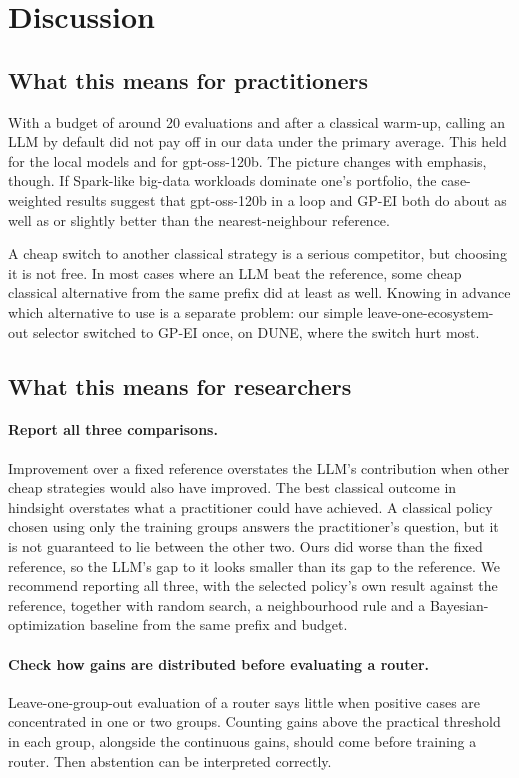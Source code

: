 \section{Discussion}

\subsection{What this means for practitioners}

With a budget of around 20 evaluations and after a classical warm-up, calling an LLM by default did not pay off in our data under the primary average. This held for the local models and for gpt-oss-120b. The picture changes with emphasis, though. If Spark-like big-data workloads dominate one's portfolio, the case-weighted results suggest that gpt-oss-120b in a loop and GP-EI both do about as well as or slightly better than the nearest-neighbour reference.

A cheap switch to another classical strategy is a serious competitor, but choosing it is not free. In most cases where an LLM beat the reference, some cheap classical alternative from the same prefix did at least as well. Knowing in advance which alternative to use is a separate problem: our simple leave-one-ecosystem-out selector switched to GP-EI once, on DUNE, where the switch hurt most.

\subsection{What this means for researchers}

\paragraph{Report all three comparisons.} Improvement over a fixed reference overstates the LLM's contribution when other cheap strategies would also have improved. The best classical outcome in hindsight overstates what a practitioner could have achieved. A classical policy chosen using only the training groups answers the practitioner's question, but it is not guaranteed to lie between the other two. Ours did worse than the fixed reference, so the LLM's gap to it looks smaller than its gap to the reference. We recommend reporting all three, with the selected policy's own result against the reference, together with random search, a neighbourhood rule and a Bayesian-optimization baseline from the same prefix and budget.

\paragraph{Check how gains are distributed before evaluating a router.} Leave-one-group-out evaluation of a router says little when positive cases are concentrated in one or two groups. Counting gains above the practical threshold in each group, alongside the continuous gains, should come before training a router. Then abstention can be interpreted correctly.

